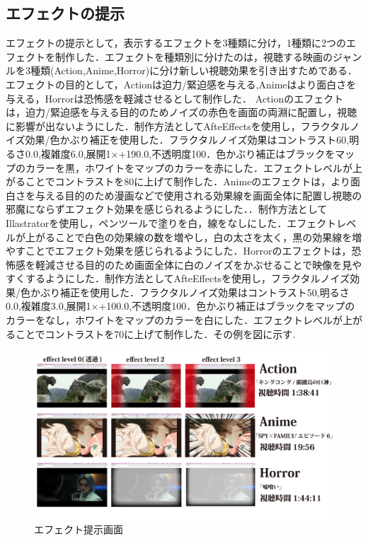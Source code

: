 \subsection{エフェクトの提示}
エフェクトの提示として，表示するエフェクトを3種類に分け，1種類に2つのエフェクトを制作した．エフェクトを種類別に分けたのは，視聴する映画のジャンルを3種類(Action,Anime,Horror)に分け新しい視聴効果を引き出すためである．
エフェクトの目的として，Actionは迫力/緊迫感を与える,Animeはより面白さを与える，Horrorは恐怖感を軽減させるとして制作した．
Actionのエフェクトは，迫力/緊迫感を与える目的のためノイズの赤色を画面の両淵に配置し，視聴に影響が出ないようにした．制作方法としてAfteEffectsを使用し，フラクタルノイズ効果/色かぶり補正を使用した．フラクタルノイズ効果はコントラスト60,明るさ0.0,複雑度6.0,展開1×+190.0,不透明度100．色かぶり補正はブラックをマップのカラーを黒，ホワイトをマップのカラーを赤にした．エフェクトレベルが上がることでコントラストを80に上げて制作した．Animeのエフェクトは，より面白さを与える目的のため漫画などで使用される効果線を画面全体に配置し視聴の邪魔にならずエフェクト効果を感じられるようにした．．制作方法としてIllastratorを使用し，ペンツールで塗りを白，線をなしにした．エフェクトレベルが上がることで白色の効果線の数を増やし，白の太さを太く，黒の効果線を増やすことでエフェクト効果を感じられるようにした．Horrorのエフェクトは，恐怖感を軽減させる目的のため画面全体に白のノイズをかぶせることで映像を見やすくするようにした．制作方法としてAfteEffectsを使用し，フラクタルノイズ効果/色かぶり補正を使用した．フラクタルノイズ効果はコントラスト50,明るさ0.0,複雑度3.0,展開1×+100.0,不透明度100．色かぶり補正はブラックをマップのカラーをなし，ホワイトをマップのカラーを白にした．エフェクトレベルが上がることでコントラストを70に上げて制作した．その例を図に示す.

\begin{figure}[H]
    \centering
    \includegraphics[width=16cm]{images/chapter3/efects.jpg}
    \caption{エフェクト提示画面}
\end{figure}